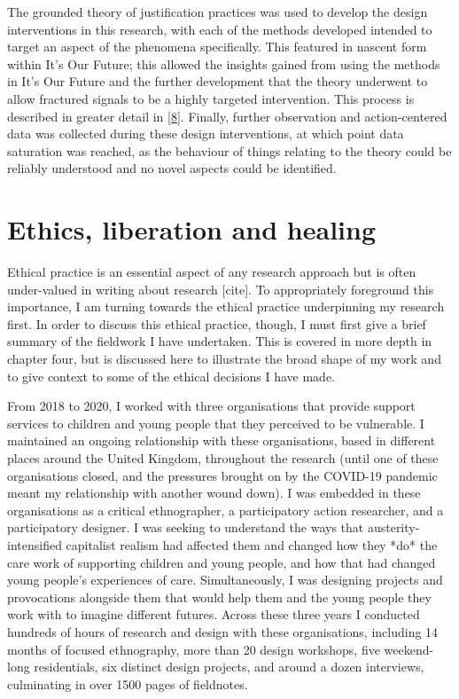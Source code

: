 The grounded theory of justification practices was used to develop the design interventions in this research, with each of the methods developed intended to target an aspect of the phenomena specifically. This featured in nascent form within It's Our Future; this allowed the insights gained from using the methods in It's Our Future and the further development that the theory underwent to allow fractured signals to be a highly targeted intervention. This process is described in greater detail in \ref{8}. Finally, further observation and action-centered data was collected during these design interventions, at which point data saturation was reached, as the behaviour of things relating to the theory could be reliably understood and no novel aspects could be identified. 




\section{Ethics, liberation and healing}
\label{3-ethics}
Ethical practice is an essential aspect of any research approach but is often under-valued in writing about research [cite]. To appropriately foreground this importance, I am turning towards the ethical practice underpinning my research first. In order to discuss this ethical practice, though, I must first give a brief summary of the fieldwork I have undertaken. This is covered in more depth in chapter four, but is discussed here to illustrate the broad shape of my work and to give context to some of the ethical decisions I have made.

From 2018 to 2020, I worked with three organisations that provide support services to children and young people that they perceived to be vulnerable. I maintained an ongoing relationship with these organisations, based in different places around the United Kingdom, throughout the research (until one of these organisations closed, and the pressures brought on by the COVID-19 pandemic meant my relationship with another wound down). I was embedded in these organisations as a critical ethnographer, a participatory action researcher, and a participatory designer. I was seeking to understand the ways that austerity-intensified capitalist realism had affected them and changed how they *do* the care work of supporting children and young people, and how that had changed young people’s experiences of care. Simultaneously, I was designing projects and provocations alongside them that would help them and the young people they work with to imagine different futures.  Across these three years I conducted hundreds of hours of research and design with these organisations, including 14 months of focused ethnography, more than 20 design workshops, five weekend-long residentials, six distinct design projects, and around a dozen interviews, culminating in over 1500 pages of fieldnotes.  

